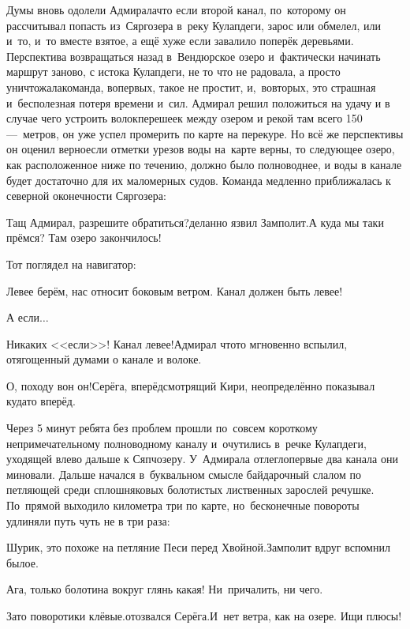 Думы вновь одолели Адмирала\mdash что если второй канал, по~которому он рассчитывал попасть из~Сяргозера в~реку Кулапдеги, зарос или обмелел, или и~то, и~то вместе взятое, а ещё хуже если завалило поперёк деревьями. Перспектива возвращаться назад в~Вендюрское озеро и~фактически начинать маршрут заново, с истока Кулапдеги, не то что не радовала, а просто уничтожала\mdash команда, во\sdash первых, такое не простит, и,~во\sdash вторых, это страшная и~бесполезная потеря времени и~сил. Адмирал решил положиться на удачу и в случае чего устроить волок\mdash перешеек между озером и рекой там всего 150\thinspace\nobreakdash---~метров, он уже успел промерить по карте на перекуре. Но всё же перспективы он оценил верно\mdash если отметки урезов воды на~карте верны, то следующее озеро, как расположенное ниже по течению, должно было полноводнее, и воды в канале будет достаточно для их маломерных судов. Команда медленно приближалась к северной оконечности Сяргозера:

\diagdash Тащ Адмирал, разрешите обратиться?\mdash деланно язвил Замполит.\mdash А куда мы таки прёмся? Там озеро закончилось!

Тот поглядел на навигатор:

\diagdash Левее берём, нас относит боковым ветром. Канал должен быть левее!

\diagdash А если$\ldots$

\diagdash Никаких <<если>>! Канал левее!\mdash Адмирал что\sdash то мгновенно вспылил, отягощенный думами о канале и волоке.

\diagdash О, походу вон он!\mdash Серёга, вперёдсмотрящий Кири, неопределённо показывал куда\sdash то вперёд.

Через 5 минут ребята без проблем прошли по~совсем короткому непримечательному полноводному каналу и~очутились в~речке Кулапдеги, уходящей влево дальше к Сяпчозеру. У~Адмирала отлегло\mdash первые два канала они миновали. Дальше начался в~буквальном смысле байдарочный слалом по петляющей среди сплошняковых болотистых лиственных зарослей речушке. По~прямой выходило километра три по карте, но~бесконечные повороты удлиняли путь чуть не в три раза:

\diagdash Шурик, это похоже на петляние Песи перед Хвойной.\mdash Замполит вдруг вспомнил былое.

\diagdash Ага, только болотина вокруг глянь какая! Ни~причалить, ни чего.

\diagdash Зато поворотики клёвые.\mdash отозвался Серёга.\mdash И~нет ветра, как на озере. Ищи плюсы!

